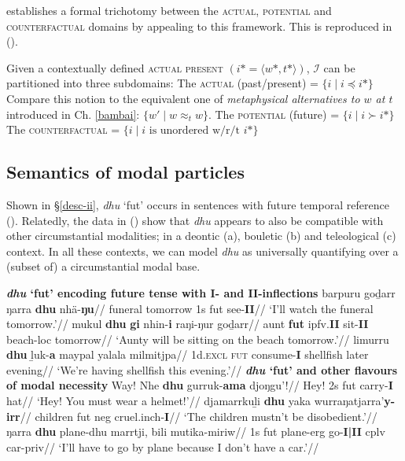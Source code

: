  establishes a formal trichotomy between the \textsc{actual, potential} and \textsc{counterfactual} domains by appealing to this framework. This is reproduced in (\nextx).

\pex Given a contextually defined \textsc{actual present} $( i*=\langle w*,t*\rangle )$, $ \mathcal I $ can be partitioned into three subdomains:
\a The \textsc{actual} (past/present) = $ \{i\mid i\preceq i*\} $\\
Compare this notion to the equivalent one of \textit{metaphysical alternatives to $ w $ at $ t $} introduced in Ch. \ref{bambai}: $ \{w'\mid w\approx_t w\} $.
\a The \textsc{potential} (future) = $ \{i\mid i\succ i*\} $
\a The \textsc{counterfactual} = $ \{i\mid i \text{ is unordered w/r/t } i* \} $
\xe


\subsection{Semantics of modal particles}

Shown in \S\ref{desc-ii}, \textit{dhu} `\gls{fut}' occurs in sentences with future temporal reference (). Relatedly, the data in () show that \textit{dhu} appears to also be compatible with other circumstantial modalities; in a deontic (a), bouletic (b) and teleological (c) context. In all these contexts, we can model \textit{dhu} as universally quantifying over a (subset of) a circumstantial modal base.

\pex \textbf{\textit{dhu} `\gls{fut}' encoding future tense with \textbf{I-} and \textbf{II}-inflections}
\a\begingl\gla barpuru goḏarr ŋarra \textbf{dhu} nhä-\textbf{ŋu}//
\glb funeral tomorrow 1s \gls{fut} see-\textbf{II}//
\glft`I'll watch the funeral tomorrow.'\trailingcitation{}//
\endgl
\a\begingl\gla mukul \textbf{dhu} \textbf{gi} nhin-\textbf{i} raŋi-ŋur goḏarr//
\glb aunt \textbf{\gls{fut}} \gls{ipfv}.\textbf{II} sit-\textbf{II} beach-\gls{loc} tomorrow//
\glft`Aunty will be sitting on the beach tomorrow.'\trailingcitation{[AW~20190409]}//\endgl
\a\begingl\gla limurru \textbf{dhu} ḻuk-\textbf{a} maypal yalala milmitjpa//
\glb 1d.\textsc{excl} \textsc{fut} consume-\textbf{I} shellfish later evening//
\glft `We're having shellfish this evening.'\trailingcitation{[DG~20190417]}//
\endgl
\xe
\pex \textbf{\textit{dhu} `\gls{fut}' and other flavours of modal necessity}
\a\begingl\gla Way! Nhe \textbf{dhu} gurruk-\textbf{ama} djoŋgu'!//
\glb Hey! 2s \gls{fut} carry-\textbf{I} hat//
\glft`Hey! You must wear a helmet!'\trailingcitation{[DG~20190405]}//\endgl
\a\begingl\gla djamarrkuḻi \textbf{dhu} yaka wurraŋatjarra'\textbf{y-irr}//
\glb children \gls{fut} \gls{neg} cruel.\gls{inch}-\textbf{I}//
\glft`The children mustn't be disobedient.'\trailingcitation{[AW~20190429]}//\endgl
\a\begingl\gla ŋarra \textbf{dhu} plane-dhu marrtji, bili mutika-miriw//
\glb 1s \gls{fut} plane-\gls{erg} go-\textbf{I|II} \gls{cplv} car-\gls{priv}//
\glft`I'll have to go by plane because I don't have a car.'\trailingcitation{[AW~20190429]}//\endgl
\xe


